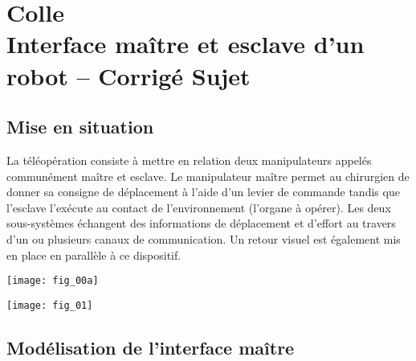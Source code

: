 \chapter*{Colle  \\ 
Interface maître et esclave d'un robot -- 
\ifprof Corrigé \else Sujet \fi}

\iflivret {} \else
\ifprof  {} \else \fi
\fi

\setcounter{question}{0}







\section*{Mise en situation}
\ifprof
\else
La téléopération consiste à mettre en relation deux manipulateurs appelés communément
maître et esclave. Le manipulateur maître permet au chirurgien de donner sa consigne de
déplacement à l’aide d’un levier de commande tandis que l’esclave l’exécute au contact de
l’environnement (l’organe à opérer). Les deux sous-systèmes échangent des informations de
déplacement et d’effort au travers d’un ou plusieurs canaux de communication. Un retour
visuel est également mis en place en parallèle à ce dispositif.

\begin{center}
\texttt{[image: fig\_00a]}
\end{center}
\fi
\begin{marginfigure}
\texttt{[image: fig\_01]}
\end{marginfigure}

\section*{Modélisation de l’interface maître}
\ifprof
\else

